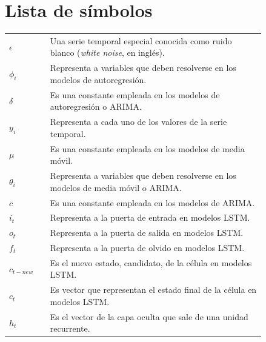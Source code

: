 \clearpage %
\chapter*{Lista de símbolos}
    \begin{longtable}{lp{0.84\linewidth}}
    
        $\epsilon$ & Una serie temporal especial conocida como
ruido blanco (\textit{white noise}, en inglés). \\

        $\phi_i$ & Representa a variables que deben resolverse  en los modelos de autoregresión. \\

        $\delta$ & Es una constante empleada en los modelos de autoregresión o ARIMA. \\

    $y_i$ & Representa a cada uno de los valores de la serie temporal. \\

    $\mu$ & Es una constante empleada en los modelos de media móvil. \\

    $\theta_i$ & Representa a variables que deben resolverse  en los modelos de media móvil o ARIMA. \\

     $c$ & Es una constante empleada en los modelos de ARIMA. \\

    $i_{t}$ & Representa a la puerta de entrada en modelos LSTM. \\

    $o_{t}$ & Representa a la puerta de salida en modelos LSTM. \\

    $f_{t}$ & Representa a la puerta de olvido en modelos LSTM. \\

    $c_{t-new}$ & Es el nuevo estado, candidato, de la célula en modelos LSTM. \\

    $c_{t}$ & Es vector que representan el estado final de la célula en modelos LSTM. \\

    $h_{t}$ & Es el vector de la capa oculta que sale de una unidad recurrente. \\


\end{longtable}
